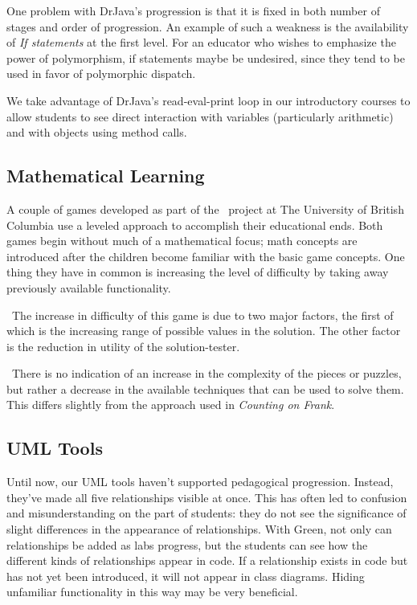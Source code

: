 \documentclass{sig-alt-release}
\begin{document}
      One problem with DrJava's progression is that it is fixed in both number of
      stages and order of progression. An example of such a weakness is the
      availability of \emph{If statements} at the first level. For an educator who
      wishes to emphasize the power of polymorphism, if statements maybe be
      undesired, since they tend to be used in favor of polymorphic dispatch.
    
      We take advantage of DrJava's read-eval-print loop in our introductory
      courses to allow students to see direct interaction with variables
      (particularly arithmetic) and with objects using method calls.

  \subsection{Mathematical Learning}
    A couple of games developed as part of the \egems\ project at The University
    of British Columbia use a leveled approach to accomplish their educational
    ends. Both games begin without much of a mathematical focus; math concepts
    are introduced after the children become familiar with the basic game
    concepts. One thing they have in common is increasing the level of
    difficulty by taking away previously available functionality.

    \cofrank\
    The increase in difficulty of this game is due to two major factors, the
    first of which is the increasing range of possible values in the solution.
    The other factor is the reduction in utility of the solution-tester.
    
    \tangrams\
    There is no indication of an increase in the complexity of the pieces or
    puzzles, but rather a decrease in the available techniques that can be used
    to solve them. This differs slightly from the approach used in
    \emph{Counting on Frank}.

  \subsection{UML Tools}
    Until now, our UML tools haven't supported pedagogical progression. Instead,
    they've made all five relationships visible at once. This has often led to
    confusion and misunderstanding on the part of students: they do not see the
    significance of slight differences in the appearance of relationships. With
    Green, not only can relationships be added as labs progress, but the
    students can see how the different kinds of relationships appear in code. If
    a relationship exists in code but has not yet been introduced, it will not
    appear in class diagrams. Hiding unfamiliar functionality in this way may
    be very beneficial.
\end{document}

